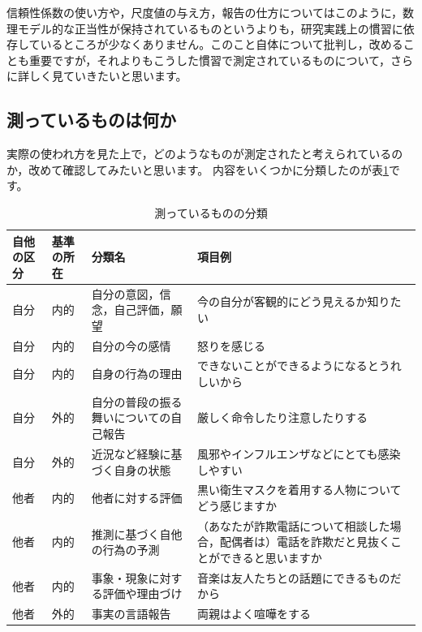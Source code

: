 \documentclass{ltjsbook}
\begin{document}
信頼性係数の使い方や，尺度値の与え方，報告の仕方についてはこのように，数理モデル的な正当性が保持されているものというよりも，研究実践上の慣習に依存しているところが少なくありません。このこと自体について批判し，改めることも重要ですが，それよりもこうした慣習で測定されているものについて，さらに詳しく見ていきたいと思います。

\subsection{測っているものは何か}
実際の使われ方を見た上で，どのようなものが測定されたと考えられているのか，改めて確認してみたいと思います。
内容をいくつかに分類したのが表\ref{ScaledObj}です。
\begin{table}
    \caption{測っているものの分類}
    \label{ScaledObj}
    \begin{tabular}{p{1cm}p{1cm}p{4cm}p{6cm}}
        自他の区分 & 基準の所在 & 分類名                 & 項目例                                             \\\hline
        自分    & 内的    & 自分の意図，信念，自己評価，願望    & 今の自分が客観的にどう見えるか知りたい                             \\
        自分    & 内的    & 自分の今の感情             & 怒りを感じる                                          \\
        自分    & 内的    & 自身の行為の理由            & できないことができるようになるとうれしいから                          \\
        自分    & 外的    & 自分の普段の振る舞いについての自己報告 & 厳しく命令したり注意したりする                                 \\
        自分    & 外的    & 近況など経験に基づく自身の状態     & 風邪やインフルエンザなどにとても感染しやすい                          \\
        他者    & 内的    & 他者に対する評価            & 黒い衛生マスクを着用する人物についてどう感じますか                       \\
        他者    & 内的    & 推測に基づく自他の行為の予測      & （あなたが詐欺電話について相談した場合，配偶者は）電話を詐欺だと見抜くことができると思いますか \\
        他者    & 内的    & 事象・現象に対する評価や理由づけ    & 音楽は友人たちとの話題にできるものだから                            \\
        他者    & 外的    & 事実の言語報告             & 両親はよく喧嘩をする                                      \\\hline
    \end{tabular}
\end{table}
\end{document}
